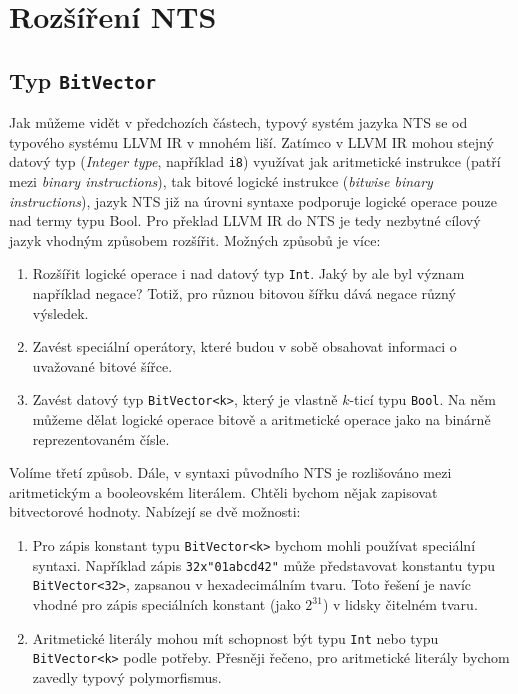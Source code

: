 \documentclass[12pt]{fithesis2}
\begin{document}
\section{Rozšíření NTS}
\label{sec:nts-extensions}
\subsection{Typ \texttt{BitVector}}
\label{subsec:nts-extensions:bitvector}
Jak můžeme vidět v předchozích částech, typový systém jazyka NTS se od typového systému LLVM IR 
v mnohém liší. Zatímco v LLVM IR mohou stejný datový typ (\textit{Integer type}, například \texttt{i8}) využívat jak aritmetické instrukce (patří mezi \textit{binary instructions}), tak bitové logické instrukce (\textit{bitwise binary instructions}), jazyk NTS již na úrovni syntaxe podporuje logické operace pouze nad termy typu Bool. Pro překlad LLVM IR do NTS je tedy nezbytné cílový jazyk vhodným způsobem rozšířit. Možných způsobů je více:
\begin{enumerate}
\item Rozšířit logické operace i nad datový typ \texttt{Int}. Jaký by ale byl význam například negace? Totiž, pro různou bitovou šířku dává negace různý výsledek.

\item Zavést speciální operátory, které budou v sobě obsahovat informaci o uvažované bitové šířce.

\item Zavést datový typ \texttt{BitVector<k>}, který je vlastně $k$-ticí typu \texttt{Bool}. Na něm můžeme dělat logické operace bitově a aritmetické operace jako na binárně reprezentovaném čísle. 
\end{enumerate}
Volíme třetí způsob. Dále, v syntaxi původního NTS je rozlišováno mezi aritmetickým a booleovském literálem. Chtěli bychom nějak zapisovat bitvectorové hodnoty. Nabízejí se dvě možnosti:
\begin{enumerate}

\item Pro zápis konstant typu \texttt{BitVector<k>} bychom mohli používat speciální syntaxi. Například zápis \texttt{32x"01abcd42"} může představovat konstantu typu \texttt{BitVector<32>}, zapsanou v hexadecimálním tvaru. Toto řešení je navíc vhodné pro zápis speciálních konstant (jako $2^{31}$) v lidsky čitelném tvaru. 

\item Aritmetické literály mohou mít schopnost být typu \texttt{Int} nebo typu \texttt{BitVector<k>} podle potřeby. Přesněji řečeno, pro aritmetické literály bychom zavedly typový polymorfismus.

\end{enumerate}
\end{document}
